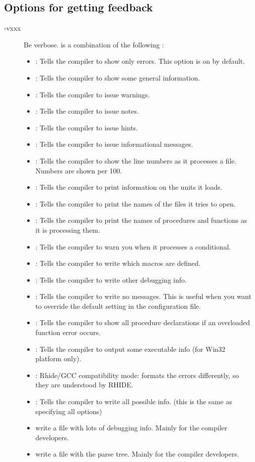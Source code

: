 \subsection{Options for getting feedback}
\begin{description}
\item[-vxxx] Be verbose.  is a combination of the following :
\begin{itemize}
\item {} : Tells the compiler to show only errors. This option is on by default.
\item {} : Tells the compiler to show some general information.
\item {} : Tells the compiler to issue warnings.
\item {} : Tells the compiler to issue notes.
\item {} : Tells the compiler to issue hints.
\item {} : Tells the compiler to issue informational messages.
\item {} : Tells the compiler to show the line numbers as it processes a
file. Numbers are shown per 100.
\item {} : Tells the compiler to print information on the units it loads.
\item {} : Tells the compiler to print the names of the files it tries
to open.
\item {} : Tells the compiler to print the names of procedures and
functions as it is processing them.
\item {} : Tells the compiler to warn you when it processes a
conditional.
\item {} : Tells the compiler to write which macros are defined.
\item {} : Tells the compiler to write other debugging info.
\item {} : Tells the compiler to write no messages. This is useful when
you want to override the default setting in the configuration file.
\item {} : Tells the compiler to show all procedure declarations if an
overloaded function error occurs.
\item {} : Tells the compiler to output some executable info (for Win32
platform only).
\item {} : Rhide/GCC compatibility mode: formats the errors
differently, so they are understood by RHIDE.
\item {} : Tells the compiler to write all possible info. (this is the
same as specifying all options)
\item {} write a file  with lots of debugging info.
Mainly for the compiler developers.
\item {} write a file  with the parse tree.
Mainly for the compiler developers.
\end{itemize}
\end{description}

